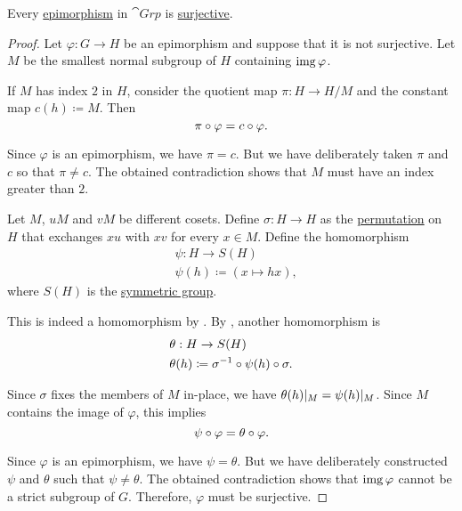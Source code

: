 \begin{proposition}\label{thm:group_epimorphisms_are_surjective}
  Every \hyperref[def:morphism_invertibility/right_cancellative]{epimorphism} in \hyperref[def:group/category]{\( \cat{Grp} \)} is \hyperref[def:function_invertibility/surjective]{surjective}.
\end{proposition}
\begin{proof}
  Let \( \varphi: G \to H \) be an epimorphism and suppose that it is not surjective. Let \( M \) be the smallest normal subgroup of \( H \) containing \( \operatorname{img} \varphi \).

  If \( M \) has index \( 2 \) in \( H \), consider the quotient map \( \pi: H \to H / M \) and the constant map \( c(h) \coloneqq M \). Then
  \begin{equation*}
    \pi \bincirc \varphi = c \bincirc \varphi.
  \end{equation*}

  Since \( \varphi \) is an epimorphism, we have \( \pi = c \). But we have deliberately taken \( \pi \) and \( c \) so that \( \pi \neq c \). The obtained contradiction shows that \( M \) must have an index greater than \( 2 \).

  Let \( M \), \( uM \) and \( vM \) be different cosets. Define \( \sigma: H \to H \) as the \hyperref[def:symmetric_group/permutation]{permutation} on \( H \) that exchanges \( xu \) with \( xv \) for every \( x \in M \). Define the homomorphism
  \begin{equation*}
    \begin{aligned}
      &\psi: H \to S(H) \\
      &\psi(h) \coloneqq (x \mapsto hx),
    \end{aligned}
  \end{equation*}
  where \( S(H) \) is the \hyperref[def:symmetric_group]{symmetric group}.

  This is indeed a homomorphism by . By , another homomorphism is
  \begin{equation*}
    \begin{aligned}
      &\theta: H \to S(H) \\
      &\theta(h) \coloneqq \sigma^{-1} \bincirc \psi(h) \bincirc \sigma.
    \end{aligned}
  \end{equation*}

  Since \( \sigma \) fixes the members of \( M \) in-place, we have \( \theta(h)\vert_M = \psi(h)\vert_M \). Since \( M \) contains the image of \( \varphi \), this implies
  \begin{equation*}
    \psi \bincirc \varphi = \theta \bincirc \varphi.
  \end{equation*}

  Since \( \varphi \) is an epimorphism, we have \( \psi = \theta \). But we have deliberately constructed \( \psi \) and \( \theta \) such that \( \psi \neq \theta \). The obtained contradiction shows that \( \operatorname{img} \varphi \) cannot be a strict subgroup of \( G \). Therefore, \( \varphi \) must be surjective.
\end{proof}

